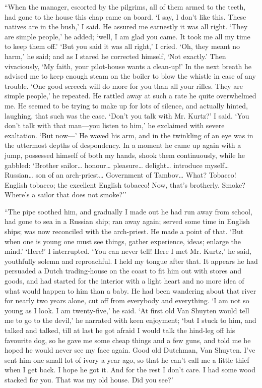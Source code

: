 \documentclass[12pt]{report}
\begin{document}
``When the manager, escorted by the pilgrims, all of them armed to the
teeth, had gone to the house this chap came on board. `I say, I don't
like this. These natives are in the bush,' I said. He assured me
earnestly it was all right. `They are simple people,' he added; `well, I
am glad you came. It took me all my time to keep them off.' `But you
said it was all right,' I cried. `Oh, they meant no harm,' he said; and
as I stared he corrected himself, `Not exactly.' Then vivaciously, `My
faith, your pilot-house wants a clean-up!' In the next breath he advised
me to keep enough steam on the boiler to blow the whistle in case of any
trouble. `One good screech will do more for you than all your rifles.
They are simple people,' he repeated. He rattled away at such a rate he
quite overwhelmed me. He seemed to be trying to make up for lots of
silence, and actually hinted, laughing, that such was the case. `Don't
you talk with Mr. Kurtz?' I said. `You don't talk with that man---you
listen to him,' he exclaimed with severe exaltation. `But now---' He
waved his arm, and in the twinkling of an eye was in the uttermost
depths of despondency. In a moment he came up again with a jump,
possessed himself of both my hands, shook them continuously, while he
gabbled: `Brother sailor\ldots{} honour\ldots{} pleasure\ldots{}
delight\ldots{} introduce myself\ldots{} Russian\ldots{} son of an
arch-priest\ldots{} Government of Tambov\ldots{} What? Tobacco! English
tobacco; the excellent English tobacco! Now, that's brotherly. Smoke?
Where's a sailor that does not smoke?''

``The pipe soothed him, and gradually I made out he had run away from
school, had gone to sea in a Russian ship; ran away again; served some
time in English ships; was now reconciled with the arch-priest. He made
a point of that. `But when one is young one must see things, gather
experience, ideas; enlarge the mind.' `Here!' I interrupted. `You can
never tell! Here I met Mr. Kurtz,' he said, youthfully solemn and
reproachful. I held my tongue after that. It appears he had persuaded a
Dutch trading-house on the coast to fit him out with stores and goods,
and had started for the interior with a light heart and no more idea of
what would happen to him than a baby. He had been wandering about that
river for nearly two years alone, cut off from everybody and everything.
`I am not so young as I look. I am twenty-five,' he said. `At first old
Van Shuyten would tell me to go to the devil,' he narrated with keen
enjoyment; `but I stuck to him, and talked and talked, till at last he
got afraid I would talk the hind-leg off his favourite dog, so he gave
me some cheap things and a few guns, and told me he hoped he would never
see my face again. Good old Dutchman, Van Shuyten. I've sent him one
small lot of ivory a year ago, so that he can't call me a little thief
when I get back. I hope he got it. And for the rest I don't care. I had
some wood stacked for you. That was my old house. Did you see?'
\end{document}
